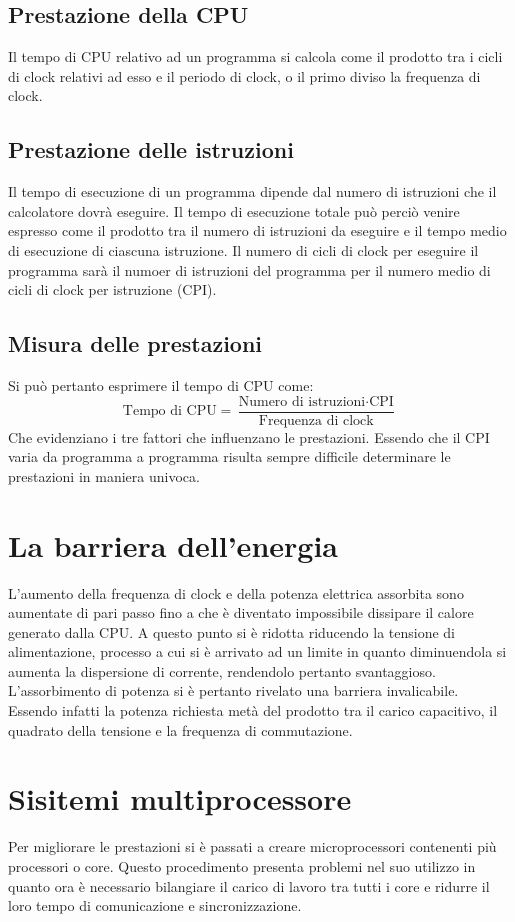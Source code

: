\subsection{Prestazione della CPU}
Il tempo di CPU relativo ad un programma si calcola come il prodotto tra i cicli di clock relativi ad esso e il periodo di clock, o il primo diviso la frequenza di clock.
\subsection{Prestazione delle istruzioni}
Il tempo di esecuzione di un programma dipende dal numero di istruzioni che il calcolatore dovr\`a eseguire. Il tempo di esecuzione totale pu\`o perci\`o venire espresso come
il prodotto tra il numero di istruzioni da eseguire e il tempo medio di esecuzione di ciascuna istruzione. Il numero di cicli di clock per eseguire il programma sar\`a
il numoer di istruzioni del programma per il numero medio di cicli di clock per istruzione (CPI).
\subsection{Misura delle prestazioni}
Si pu\`o pertanto esprimere il tempo di CPU come:
\begin{equation}
\text{Tempo di CPU}=\frac{\text{Numero di istruzioni}\cdot\text{CPI}}{\text{Frequenza di clock}}
\end{equation}
Che evidenziano i tre fattori che influenzano le prestazioni. Essendo che il CPI varia da programma a programma risulta sempre difficile determinare le prestazioni in maniera 
univoca.
\section{La barriera dell'energia}
L'aumento della frequenza di clock e della potenza elettrica assorbita sono aumentate di pari passo fino a che \`e diventato impossibile dissipare il calore generato dalla CPU.
A questo punto si \`e ridotta riducendo la tensione di alimentazione, processo a cui si \`e arrivato ad un limite in quanto diminuendola si aumenta la dispersione di corrente, 
rendendolo pertanto svantaggioso. L'assorbimento di potenza si \`e pertanto rivelato una barriera invalicabile. Essendo infatti la potenza richiesta met\`a del prodotto tra
il carico capacitivo, il quadrato della tensione e la frequenza di commutazione. 
\section{Sisitemi multiprocessore}
Per migliorare le prestazioni si \`e passati a creare microprocessori contenenti pi\`u processori o core. Questo procedimento presenta problemi nel suo utilizzo in quanto ora
\`e necessario bilangiare il carico di lavoro tra tutti i core e ridurre il loro tempo di comunicazione e sincronizzazione. 